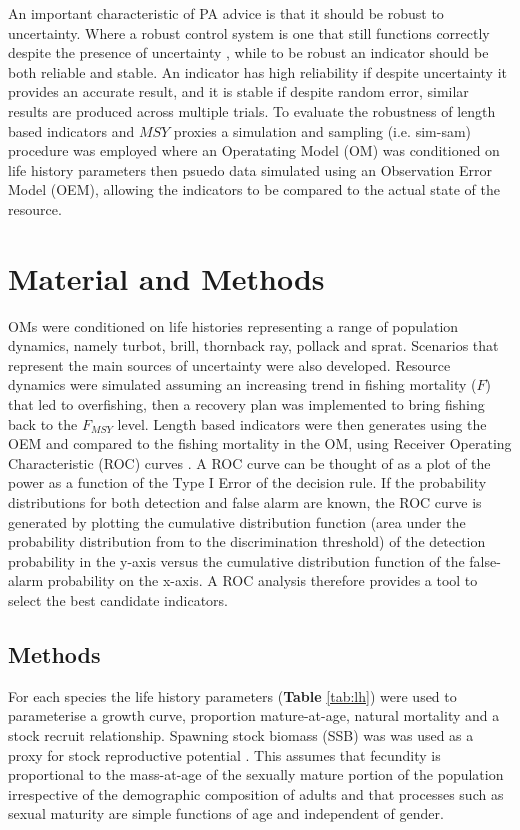 \documentclass[12pt,doublespacing,a4paper]{ouparticle}
\begin{document}
An important characteristic of PA advice is that it should be robust to uncertainty. Where a robust control system is one that still functions correctly despite the presence of uncertainty \citep{radatz1990ieee, zhou1996robust}, while to be robust an indicator should be both reliable and stable. An indicator has high reliability if despite uncertainty it provides an accurate result, and it is stable if despite random error, similar results are produced across multiple trials. To evaluate the robustness of length based indicators and $MSY$ proxies  a simulation and sampling (i.e. sim-sam) procedure was employed where an Operatating Model (OM) was conditioned on life history parameters then psuedo data simulated using an Observation Error Model (OEM), allowing the indicators to be compared to the actual state of the resource.


\section{Material and Methods}

OMs were conditioned on life histories representing a range of population dynamics, namely turbot, brill, thornback ray, pollack and sprat. Scenarios that represent the main sources of uncertainty were also developed. Resource dynamics were simulated assuming an increasing trend in fishing mortality ($F$) that led to overfishing, then a recovery plan was implemented to bring fishing back to the $F_{MSY}$ level. Length based indicators were then generates using the OEM and compared to the fishing mortality in the OM, using Receiver Operating Characteristic (ROC) curves \citep{green1966signal}. A ROC curve can be thought of as a plot of the power as a function of the Type I Error of the decision rule. If the probability distributions for both detection and false alarm are known, the ROC curve is generated by plotting the cumulative distribution function (area under the probability distribution from  to the discrimination threshold) of the detection probability in the y-axis versus the cumulative distribution function of the false-alarm probability on the x-axis. A ROC analysis therefore provides a tool to select the best candidate indicators. 

\subsection{Methods}

For each species the life history parameters (\textbf{Table} \ref{tab:lh}) were used to parameterise a \cite{vonbert1957quantitative} growth curve, proportion mature-at-age, natural mortality \citep{lorenzen2002density} and a \cite{beverton1993dynamics} stock recruit relationship. Spawning stock biomass (SSB) was was used as a proxy for stock reproductive potential \citep[SRP][]{trippel_estimation_1999}. This assumes that fecundity is proportional to the mass-at-age of the sexually mature portion of the population irrespective of the demographic composition of adults \citep{murawski_impacts_2001} and that processes such as sexual maturity are simple functions of age \citep{matsuda_inconsistency_1996} and independent of gender.
\end{document}
